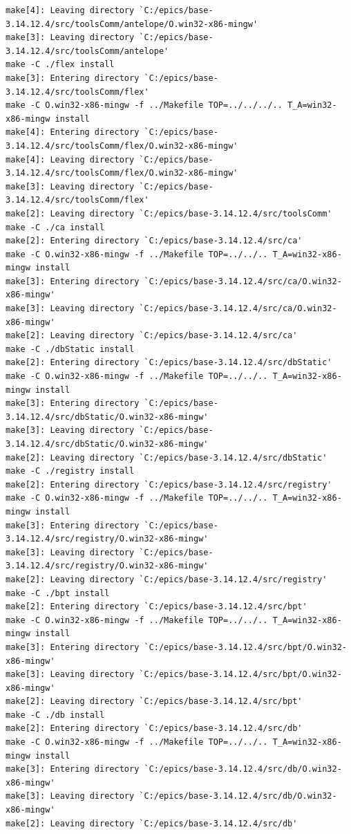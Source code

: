 \documentclass[11pt
  , a4paper
  , article
  , oneside
]{memoir}
\begin{document}
\begin{lstlisting}[style=termstyle]
make[4]: Leaving directory `C:/epics/base-3.14.12.4/src/toolsComm/antelope/O.win32-x86-mingw'
make[3]: Leaving directory `C:/epics/base-3.14.12.4/src/toolsComm/antelope'
make -C ./flex install
make[3]: Entering directory `C:/epics/base-3.14.12.4/src/toolsComm/flex'
make -C O.win32-x86-mingw -f ../Makefile TOP=../../../.. T_A=win32-x86-mingw install
make[4]: Entering directory `C:/epics/base-3.14.12.4/src/toolsComm/flex/O.win32-x86-mingw'
make[4]: Leaving directory `C:/epics/base-3.14.12.4/src/toolsComm/flex/O.win32-x86-mingw'
make[3]: Leaving directory `C:/epics/base-3.14.12.4/src/toolsComm/flex'
make[2]: Leaving directory `C:/epics/base-3.14.12.4/src/toolsComm'
make -C ./ca install
make[2]: Entering directory `C:/epics/base-3.14.12.4/src/ca'
make -C O.win32-x86-mingw -f ../Makefile TOP=../../.. T_A=win32-x86-mingw install
make[3]: Entering directory `C:/epics/base-3.14.12.4/src/ca/O.win32-x86-mingw'
make[3]: Leaving directory `C:/epics/base-3.14.12.4/src/ca/O.win32-x86-mingw'
make[2]: Leaving directory `C:/epics/base-3.14.12.4/src/ca'
make -C ./dbStatic install
make[2]: Entering directory `C:/epics/base-3.14.12.4/src/dbStatic'
make -C O.win32-x86-mingw -f ../Makefile TOP=../../.. T_A=win32-x86-mingw install
make[3]: Entering directory `C:/epics/base-3.14.12.4/src/dbStatic/O.win32-x86-mingw'
make[3]: Leaving directory `C:/epics/base-3.14.12.4/src/dbStatic/O.win32-x86-mingw'
make[2]: Leaving directory `C:/epics/base-3.14.12.4/src/dbStatic'
make -C ./registry install
make[2]: Entering directory `C:/epics/base-3.14.12.4/src/registry'
make -C O.win32-x86-mingw -f ../Makefile TOP=../../.. T_A=win32-x86-mingw install
make[3]: Entering directory `C:/epics/base-3.14.12.4/src/registry/O.win32-x86-mingw'
make[3]: Leaving directory `C:/epics/base-3.14.12.4/src/registry/O.win32-x86-mingw'
make[2]: Leaving directory `C:/epics/base-3.14.12.4/src/registry'
make -C ./bpt install
make[2]: Entering directory `C:/epics/base-3.14.12.4/src/bpt'
make -C O.win32-x86-mingw -f ../Makefile TOP=../../.. T_A=win32-x86-mingw install
make[3]: Entering directory `C:/epics/base-3.14.12.4/src/bpt/O.win32-x86-mingw'
make[3]: Leaving directory `C:/epics/base-3.14.12.4/src/bpt/O.win32-x86-mingw'
make[2]: Leaving directory `C:/epics/base-3.14.12.4/src/bpt'
make -C ./db install
make[2]: Entering directory `C:/epics/base-3.14.12.4/src/db'
make -C O.win32-x86-mingw -f ../Makefile TOP=../../.. T_A=win32-x86-mingw install
make[3]: Entering directory `C:/epics/base-3.14.12.4/src/db/O.win32-x86-mingw'
make[3]: Leaving directory `C:/epics/base-3.14.12.4/src/db/O.win32-x86-mingw'
make[2]: Leaving directory `C:/epics/base-3.14.12.4/src/db'

\end{lstlisting}
\end{document}
